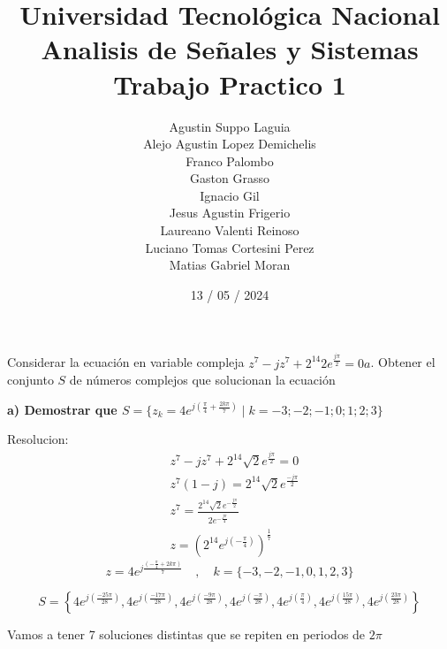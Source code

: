 \documentclass[12pt,a4paper]{report}
\title{%
  \fontsize{25}{0}\selectfont Universidad Tecnológica Nacional \\
  \fontsize{22}{30}\selectfont Analisis de Señales y Sistemas \\
  \fontsize{20}{25}\selectfont Trabajo Practico 1
}
\author{
Agustin Suppo Laguia\\
Alejo Agustin Lopez Demichelis\\
Franco Palombo\\
Gaston Grasso\\
Ignacio Gil\\
Jesus Agustin Frigerio\\
Laureano Valenti Reinoso\\
Luciano Tomas Cortesini Perez\\
Matias Gabriel Moran\\
}
\date{13 / 05 / 2024}
\begin{document}
\maketitle

\chapter{}%
Considerar la ecuación en variable compleja $z^7-jz^7+2^{14}2e^{\frac{j\pi}{2}}=0a$. 
Obtener el conjunto $S$ de números complejos que solucionan la ecuación

\textbf{a) Demostrar que  $S = \{z_k = 4e^{j(\frac{\pi}{4}+\frac{2k\pi}{7})} \mid k=-3;-2;-1;0;1;2;3\}$}

Resolucion:
\begin{align*}
&z^7 - jz^7 + 2^{14}\sqrt{2}e^{\frac{j\pi}{2}} = 0\\
&z^7(1-j) = 2^{14}\sqrt{2}e^{\frac{-j\pi}{2}}\\
&z^7 = \frac{2^{14}\sqrt{2}e^{-\frac{j\pi}{2}}} {2e^{-\frac{j\pi}{4}}}\\
&z = (2^{14}e^{j(-\frac{\pi} {4})})^{\frac{1}{7}}
\end{align*}
$$z = 4e^{j\frac{(-\frac{\pi}{4}+2k\pi)}{7}} \quad,\quad k = \{-3,-2,-1,0,1,2,3\}$$

$$
S = \left\{ 4e^{j \left( \frac{-25 \pi}{28} \right)}, 4e^{j \left( \frac{-17 \pi}{28} \right)}, 4e^{j \left( \frac{-9 \pi}{28} \right)}, 4e^{j \left( \frac{-\pi}{28} \right)}, 4e^{j \left( \frac{\pi}{4} \right)}, 4e^{j \left( \frac{15 \pi}{28} \right)}, 4e^{j \left( \frac{23 \pi}{28} \right)} \right\}
$$

Vamos a tener 7 soluciones distintas que se repiten en periodos de $2\pi$\\
\end{document}
